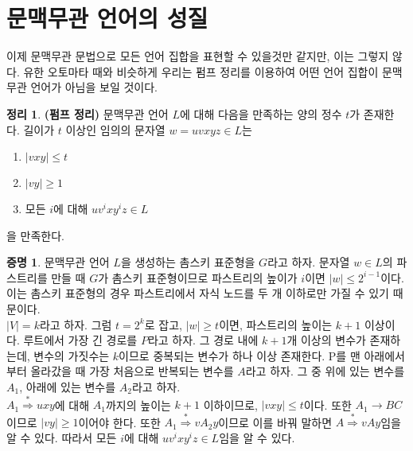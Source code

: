 \documentclass[b5paper, 11pt]{book}
\theoremstyle{definition}
\newtheorem{thm}[defn]{정리}
\newtheorem*{pf}{증명}
\begin{document}
\section{문맥무관 언어의 성질}
이제 문맥무관 문법으로 모든 언어 집합을 표현할 수 있을것만 같지만, 이는 그렇지 않다. 유한 오토마타 때와 비슷하게 우리는 펌프 정리를 이용하여 어떤 언어 집합이 문맥무관 언어가 아님을 보일 것이다.
\begin{thm}
\textbf{(펌프 정리)} 문맥무관 언어 $L$에 대해 다음을 만족하는 양의 정수 $t$가 존재한다. 길이가 $t$ 이상인 임의의 문자열 $w = uvxyz\in L$는
\begin{enumerate}
    \item $\vert vxy \vert \le t$ 
    \item $\vert vy \vert \ge 1$ 
    \item 모든 $i$에 대해 $uv^i xy^i z \in L$
\end{enumerate}
을 만족한다. 
\end{thm}
\begin{pf}
문맥무관 언어 $L$을 생성하는 촘스키 표준형을 $G$라고 하자. 문자열 $w \in L$의 파스트리를 만들 때 $G$가 촘스키 표준형이므로 파스트리의 높이가 $i$이면 $\vert w\vert \le 2^{i-1}$이다. 이는 촘스키 표준형의 경우 파스트리에서 자식 노드를 두 개 이하로만 가질 수 있기 때문이다. \\ 
$\vert V \vert = k$라고 하자. 그럼 $t = 2^{k}$로 잡고, $\vert w  \vert \ge t$이면, 파스트리의 높이는 $k+1$ 이상이다. 루트에서 가장 긴 경로를 $P$라고 하자. 그 경로 내에 $k+1$개 이상의 변수가 존재하는데, 변수의 가짓수는 $k$이므로 중복되는 변수가 하나 이상 존재한다. P를 맨 아래에서부터 올라갔을 때 가장 처음으로 반복되는 변수를 $A$라고 하자. 그 중 위에 있는 변수를 $A_1$, 아래에 있는 변수를 $A_2$라고 하자.  \\ 
$A_1 \overset{*}{\Rightarrow} uxy$에 대해 $A_1$까지의 높이는 $k+1$ 이하이므로, $\vert vxy\vert \le t$이다. 또한 $A_1 \rightarrow BC$이므로 $\vert vy\vert \ge 1$이어야 한다. 또한 $A_1 \overset{*}{\Rightarrow} vA_2y $이므로 이를 바꿔 말하면 $A \overset{*}{\Rightarrow} vAy$임을 알 수 있다. 따라서 모든 $i$에 대해 $uv^i x y^i z \in L$임을 알 수 있다. 
\end{pf}
\begin{figure}[!ht]
    \centering
\caption{}
\end{figure}
\end{document}
